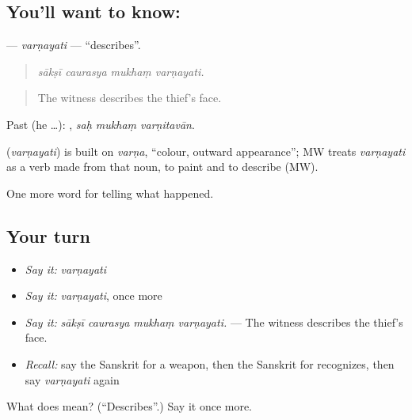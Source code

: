 \subsection*{You'll want to know: }
\textbf{} — \emph{varṇayati} — \textquotedblleft{}describes\textquotedblright{}.

\begin{quote}
   
\end{quote}

\begin{quote}
\emph{sākṣī caurasya mukhaṃ varṇayati.}
\end{quote}

\begin{quote}
The witness describes the thief's face.
\end{quote}

Past (he …):   , \emph{saḥ mukhaṃ varṇitavān}.

\begin{cousinweb}
\textbf{} (\emph{varṇayati}) is built on \emph{varṇa}, \textquotedblleft{}colour, outward appearance\textquotedblright{}; MW treats \emph{varṇayati} as a verb made from that noun, to paint and to describe (MW).
\end{cousinweb}

\begin{grammarlens}[title={What you've built}]
One more word for telling what happened.
\end{grammarlens}

\subsection*{Your turn}
\begin{itemize}
\raggedright
  \item \emph{Say it:} \emph{varṇayati}
  \item \emph{Say it:} \emph{varṇayati}, once more
  \item \emph{Say it:} \emph{sākṣī caurasya mukhaṃ varṇayati.} — The witness describes the thief's face.
  \item \emph{Recall:} say the Sanskrit for a weapon, then the Sanskrit for recognizes, then say \emph{varṇayati} again
\end{itemize}

\begin{tcolorbox}[breakable,colback=teal!4,colframe=teal!35!black,title={Before you move on}]
What does  mean? (\textquotedblleft{}Describes\textquotedblright{}.) Say it once more.
\end{tcolorbox}
